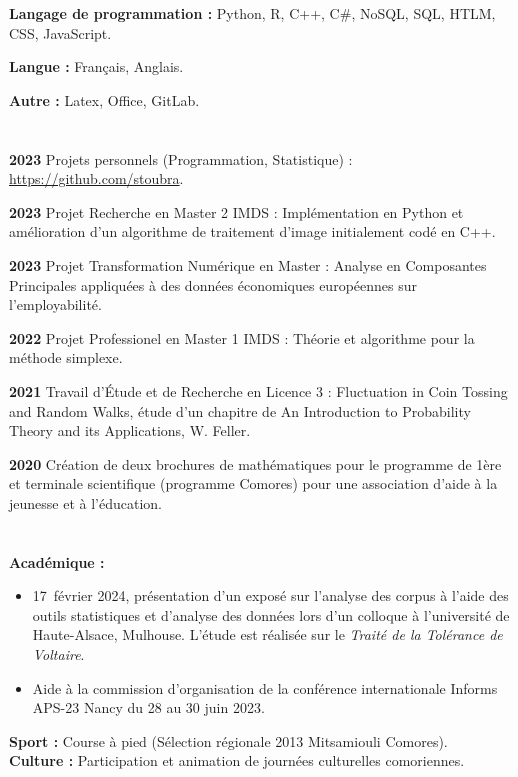 \documentclass[11pt]{article}
\begin{document}
	\textbf{Langage de programmation :} Python, R, C++, C\#, NoSQL, SQL, HTLM, CSS, JavaScript.
	
	\textbf{Langue :} Français, Anglais.
	
	
	\textbf{Autre :} Latex, Office, GitLab.	
	\section*{\color{RoyalBlue}{Projets}}
	\noindent
	\textbf{2023} Projets personnels (Programmation, Statistique) : \url{https://github.com/stoubra}.
	
	\textbf{2023} Projet Recherche en Master 2 IMDS : Implémentation en Python et amélioration d’un algorithme de traitement d’image initialement codé en C++.
	
	\textbf{2023} Projet Transformation Numérique en Master : Analyse en Composantes Principales appliquées à des données économiques européennes sur l’employabilité.     
	
	\textbf{2022} Projet Professionel en Master 1 IMDS : Théorie et algorithme pour la méthode simplexe.
	
	\textbf{2021} Travail d'Étude et de Recherche en Licence 3 : Fluctuation in Coin Tossing and Random Walks,
	étude d'un chapitre de An Introduction to Probability Theory and its Applications, W. Feller.
	
	\textbf{2020} Création de deux brochures de mathématiques pour le programme de 1ère et terminale scientifique (programme Comores) pour une association d'aide à la jeunesse et à l’éducation.
	
	\section*{\color{RoyalBlue}{Divers}}
	\noindent
	\textbf{Académique : }
	\begin{itemize}
		\item[$\bullet$] 17 février 2024, présentation d’un exposé sur l’analyse des corpus à l’aide des outils statistiques et d'analyse des données lors d’un colloque à l'université de Haute-Alsace, Mulhouse. L’étude est réalisée sur le \textit{Traité de la Tolérance de Voltaire}.
		\item[$\bullet$] Aide à la commission d'organisation de la conférence internationale Informs APS-23 Nancy du 28 au 30 juin 2023.
	\end{itemize}
	\textbf{Sport : } Course à pied (Sélection régionale 2013 Mitsamiouli Comores).\\
	\textbf{Culture : } Participation et animation de journées culturelles comoriennes.
	
\end{document}
